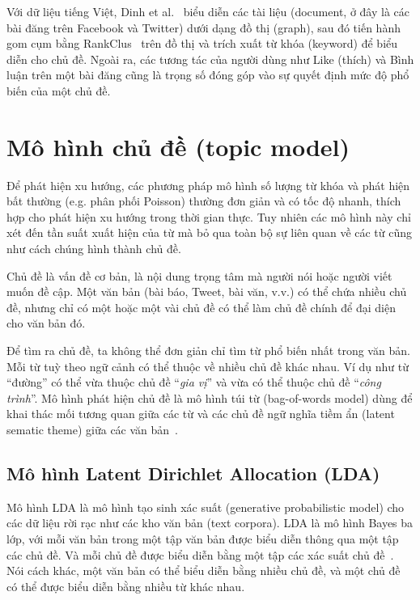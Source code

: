 Với dữ liệu tiếng Việt, Dinh et al.~\cite{dinhImprovingSocialTrend2021} biểu diễn các tài liệu (document, ở đây là các bài đăng trên Facebook và Twitter) dưới dạng đồ thị (graph), sau đó tiến hành gom cụm bằng RankClus~\cite{sunRankClusIntegratingClustering2009} trên đồ thị và trích xuất từ khóa (keyword) để biểu diễn cho chủ đề. Ngoài ra, các tương tác của người dùng như Like (thích) và Bình luận trên một bài đăng cũng là trọng số đóng góp vào sự quyết định mức độ phổ biến của một chủ đề.

\section{Mô hình chủ đề (topic model)}
Để phát hiện xu hướng, các phương pháp mô hình số lượng từ khóa và phát hiện bất thường (e.g. phân phối Poisson) thường đơn giản và có tốc độ nhanh, thích hợp cho phát hiện xu hướng trong thời gian thực. Tuy nhiên các mô hình này chỉ xét đến tần suất xuất hiện của từ mà bỏ qua toàn bộ sự liên quan về các từ cũng như cách chúng hình thành chủ đề.

Chủ đề là vấn đề cơ bản, là nội dung trọng tâm mà người nói hoặc người viết muốn đề cập. Một văn bản (bài báo, Tweet, bài văn, v.v.) có thể chứa nhiều chủ đề, nhưng chỉ có một hoặc một vài chủ đề có thể làm chủ đề chính để đại diện cho văn bản đó.

Để tìm ra chủ đề, ta không thể đơn giản chỉ tìm từ phổ biến nhất trong văn bản.  Mỗi từ tuỳ theo ngữ cảnh có thể thuộc về nhiều chủ đề khác nhau. Ví dụ như từ ``đường'' có thể vừa thuộc chủ đề ``\textit{gia vị}'' và vừa có thể thuộc chủ đề ``\textit{công trình}''. Mô hình phát hiện chủ đề là mô hình túi từ (bag-of-words model) dùng để khai thác mối tương quan giữa các từ và các chủ đề ngữ nghĩa tiềm ẩn (latent sematic theme) giữa các văn bản~\cite{madaniRealtimeTrendingTopics2015}.

\subsection{Mô hình Latent Dirichlet Allocation (LDA)}
\label{sec:lda}

Mô hình LDA là mô hình tạo sinh xác suất (generative probabilistic model) cho các dữ liệu rời rạc như các kho văn bản (text corpora). LDA là mô hình Bayes ba lớp, với mỗi văn bản trong một tập văn bản được biểu diễn thông qua một tập các chủ đề. Và mỗi chủ đề được biểu diễn bằng một tập các xác suất chủ đề~\cite{bleiLatentDirichletAllocation2003}. Nói cách khác, một văn bản có thể biểu diễn bằng nhiều chủ đề, và một chủ đề có thể được biểu diễn bằng nhiều từ khác nhau.

